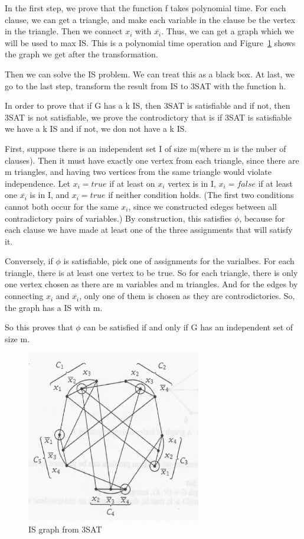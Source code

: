 \documentclass[usletter]{article}
\begin{document}
In the first step, we prove that the function f takes polynomial time. For each clause, we can get a triangle, and make each variable in the clause be the vertex in the triangle. Then we connect $x_{i}$ with $\overline{x_{i}}$. Thus, we can get a graph which we will be used to max IS. This is a polynomial time operation and Figure~\ref{fig:3SAT-IS} shows the graph we get after the transformation.

Then we can solve the IS problem. We can treat this as a black box. At last, we go to the last step, transform the result from IS to 3SAT with the function h.

In order to prove that if G has a k IS, then 3SAT is satisfiable and if not, then 3SAT is not satisfiable, we prove the controdictory that is if 3SAT is satisfiable we have a k IS and if not, we don not have a k IS.

First, suppose there is an independent set I of size m(where m is the nuber of clauses). Then it must have exactly one vertex from each triangle, since there are m triangles, and having two vertices from the same triangle would violate independence. Let $x_{i} = true$ if at least on $x_{i}$ vertex is in I, $x_{i} = false$ if at least one $\overline{x_{i}}$ is in I, and $x_{i} = true$ if neither condition holds. (The first two conditions cannot both occur for the same $x_{i}$, since we constructed edeges between all contradictory pairs of variables.) By construction, this satisfies $\phi$, because for each clause we have made at least one of the three assignments that will satisfy it.

Conversely, if $\phi$ is satisfiable, pick one of assignments for the varialbes. For each triangle, there is at least one vertex to be true. So for each triangle, there is only one vertex chosen as there are m variables and m triangles. And for the edges by connecting $x_{i}$ and $\overline{x_{i}}$, only one of them is chosen as they are controdictories. So, the graph has a IS with m.

So this proves that $\phi$ can be satisfied if and only if G has an independent set of size m.  

\begin{figure}[bht]
\begin{center}
     \includegraphics[width=3.0in]{figures/3SAT-IS}
\caption{\label{fig:3SAT-IS}IS graph from 3SAT}
\end{center}
\end{figure}
\end{document}
